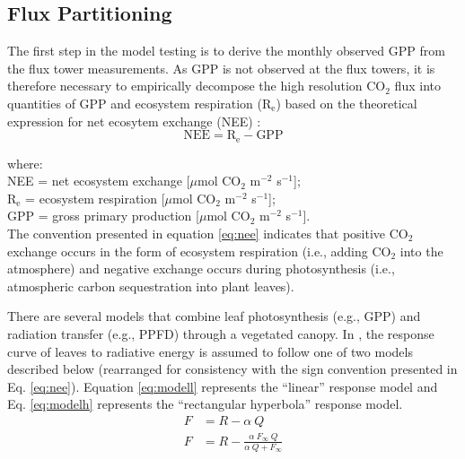 \subsection{Flux Partitioning}
\label{sec:fluxparti}
The first step in the model testing is to derive the monthly observed GPP from the flux tower measurements.
As GPP is not observed at the flux towers, it is therefore necessary to empirically decompose the high resolution CO$_{2}$ flux into quantities of GPP and ecosystem respiration (R$_{\mathrm{e}}$) based on the theoretical expression for net ecosytem exchange (NEE) \parencite{lovett06}:
%
\begin{equation}
\label{eq:nee}
    \text{NEE} = \text{R}_{\text{e}} - \text{GPP}
\end{equation}

\noindent where:\\
\indent NEE = net ecosystem exchange [$\mu$mol CO$_2$ m$^{-2}$ s$^{-1}$];\\
\indent R$_\text{e}$ = ecosystem respiration [$\mu$mol CO$_2$ m$^{-2}$ s$^{-1}$];\\
\indent GPP = gross primary production [$\mu$mol CO$_2$ m$^{-2}$ s$^{-1}$].\\

\noindent The convention presented in equation \ref{eq:nee} indicates that positive CO$_{2}$ exchange occurs in the form of ecosystem respiration (i.e., adding CO$_{2}$ into the atmosphere) and negative exchange occurs during photosynthesis (i.e., atmospheric carbon sequestration into plant leaves). 

There are several models that combine leaf photosynthesis (e.g., GPP) and radiation transfer (e.g., PPFD) through a vegetated canopy.  
In \parencite{ruimy95}, the response curve of leaves to radiative energy is assumed to follow one of two models described below (rearranged for consistency with the sign convention presented in Eq. \ref{eq:nee}).  
Equation \ref{eq:modell} represents the ``linear'' response model and Eq. \ref{eq:modelh} represents the ``rectangular hyperbola'' response model.
\begin{subequations}
\label{eq:fmodels}
\begin{align}
    F &= R - \alpha\: Q \label{eq:modell} \\
    F &= R - \frac{\alpha\: F_\infty\: Q}
                  {\alpha\: Q + F_\infty}\label{eq:modelh}
\end{align}
\end{subequations}

